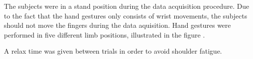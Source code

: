 The subjects were in a stand position during the data acquisition procedure. Due to the fact that the hand gestures only consists of wrist movements, the subjects should not move the fingers during the data aquisition. Hand gestures were performed in five different limb positions, illustrated in the figure .


A relax time was given between trials in order to avoid shoulder fatigue.

